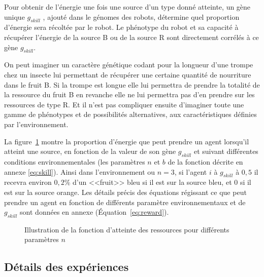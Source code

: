 \documentclass[a4paper,10pt]{report}
\begin{document}
Pour obtenir de l'énergie une fois une source d'un type donné atteinte, un gène unique $g_{skill}$ , ajouté dans le génomes des robots, détermine quel proportion d'énergie sera récoltée par le robot. Le phénotype du robot et sa capacité à récupérer l'énergie de la source B ou de la source R sont directement corrélés à ce gène $g_{skill}$.

On peut imaginer un caractère génétique codant pour la longueur d'une trompe chez un insecte lui permettant de récupérer une certaine quantité de nourriture dans le fruit B. Si la trompe est longue elle lui permettra de prendre la totalité de la ressource du fruit B en revanche elle ne lui permettra pas d'en prendre sur les ressources de type R. Et il n'est pas compliquer ensuite d'imaginer toute une gamme de phénotypes et de possibilités alternatives, aux caractéristiques définies par l'environnement. 

La figure~\ref{fig:reward} montre la proportion d'énergie que peut prendre un agent lorsqu'il atteint une source, en fonction de la valeur de son gène $g_{skill}$ et suivant différentes conditions environnementales (les paramètres $n$ et $b$ de la fonction décrite en annexe \ref{eq:skill}). Ainsi dans l'environnement ou $n=3$, si l'agent $i$ à $g_{skill}$ à $0,5$ il recevra environ $0,2\%$ d'un <<fruit>> bleu si il est sur la source bleu, et 0 si il est sur la source orange. Les détails précis des équations régissant ce que peut prendre un agent en fonction de différents paramètre environnementaux et de $g_{skill}$ sont données en annexe (\'{E}quation~\ref{eq:reward}).

\begin{figure}[H]
\caption[Fonction d'atteinte des ressources]{Illustration de la fonction d'atteinte des ressources pour différents paramètres $n$}
\label{fig:reward}

\end{figure}

\subsection{Détails des expériences}
\label{sec:exp:detail}
\end{document}
